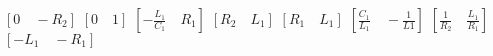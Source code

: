 $[0\quad -R_2]$
$[0\quad 1]$
$[-\frac{L_1}{C_1}\quad R_1]$
$[R_2 \quad L_1]$
$[R_1\quad L_1]$
$[\frac{C_1}{L_1} \quad -\frac{1}{L1}]$
$[\frac{1}{R_2}\quad \frac{L_1}{R_1}]$
$[-L_1\quad -R_1]$
